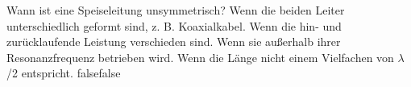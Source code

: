     {Wann ist eine Speiseleitung unsymmetrisch?}
    {Wenn die beiden Leiter unterschiedlich geformt sind, z. B. Koaxialkabel.}
    {Wenn die hin- und zurücklaufende Leistung verschieden sind.}
    {Wenn sie außerhalb ihrer Resonanzfrequenz betrieben wird.}
    {Wenn die Länge nicht einem Vielfachen von $\lambda$/2 entspricht.}
    {false}{false}